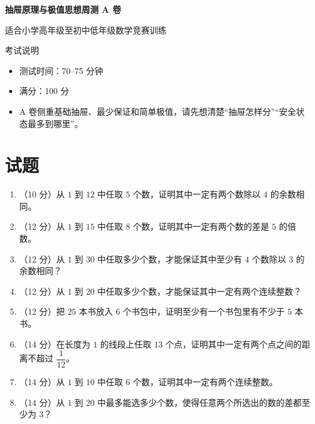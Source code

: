\documentclass[11pt,a4paper,fontset=fandol]{ctexart}
\newcommand{\answerspace}{\vspace{2.3cm}}
\newcommand{\biganswerspace}{\vspace{3.1cm}}
\begin{document}
\thispagestyle{empty}
\begin{center}
{\fontsize{22}{28}\selectfont\bfseries 抽屉原理与极值思想周测 A 卷\par}
\vspace{0.4cm}
{\large 适合小学高年级至初中低年级数学竞赛训练\par}
\end{center}

\begin{infobox}{考试说明}
\begin{itemize}
  \item 测试时间：70--75 分钟
  \item 满分：100 分
  \item A 卷侧重基础抽屉、最少保证和简单极值，请先想清楚“抽屉怎样分”“安全状态最多到哪里”。
\end{itemize}
\end{infobox}

\section{试题}

\begin{enumerate}
  \item （10 分）从 $1$ 到 $12$ 中任取 $5$ 个数，证明其中一定有两个数除以 $4$ 的余数相同。
  \answerspace

  \item （12 分）从 $1$ 到 $15$ 中任取 $8$ 个数，证明其中一定有两个数的差是 $5$ 的倍数。
  \answerspace

  \item （12 分）从 $1$ 到 $30$ 中任取多少个数，才能保证其中至少有 $4$ 个数除以 $3$ 的余数相同？
  \answerspace

  \item （12 分）从 $1$ 到 $20$ 中任取多少个数，才能保证其中一定有两个连续整数？
  \answerspace

  \item （12 分）把 $25$ 本书放入 $6$ 个书包中，证明至少有一个书包里有不少于 $5$ 本书。
  \answerspace

  \item （14 分）在长度为 $1$ 的线段上任取 $13$ 个点，证明其中一定有两个点之间的距离不超过 $\dfrac{1}{12}$。
  \biganswerspace

  \item （14 分）从 $1$ 到 $10$ 中任取 $6$ 个数，证明其中一定有两个连续整数。
  \answerspace

  \item （14 分）从 $1$ 到 $20$ 中最多能选多少个数，使得任意两个所选出的数的差都至少为 $3$？
  \biganswerspace
\end{enumerate}
\end{document}
